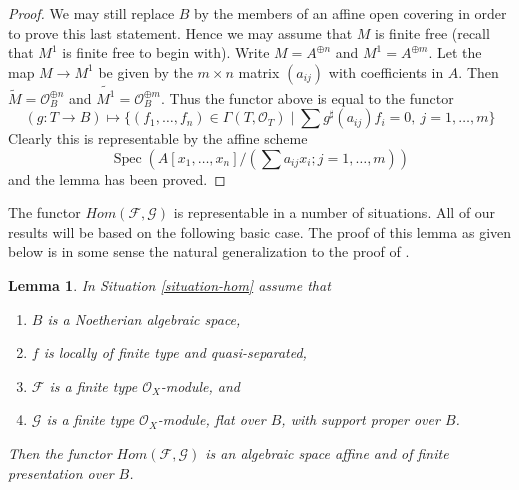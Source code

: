 \documentclass{stacks-project}
\theoremstyle{plain}
\newtheorem{lemma}[subsection]{Lemma}
\theoremstyle{definition}
\theoremstyle{remark}
\numberwithin{equation}{subsection}
\def\Spec{\mathop{\mathrm{Spec}}}
\begin{document}
\begin{proof}
\medskip\noindent
We may still replace $B$ by the members of an affine open covering
in order to prove this last statement. Hence we may assume that $M$
is finite free (recall that $M^1$ is finite free to begin with).
Write $M = A^{\oplus n}$ and $M^1 = A^{\oplus m}$. Let the map
$M \to M^1$ be given by the $m \times n$ matrix $(a_{ij})$ with
coefficients in $A$. Then $\widetilde{M} = \mathcal{O}_B^{\oplus n}$
and $\widetilde{M^1} = \mathcal{O}_B^{\oplus m}$. Thus the functor
above is equal to the functor
$$
(g : T \to B) \longmapsto
\{(f_1, \ldots, f_n) \in \Gamma(T, \mathcal{O}_T) \mid
\sum g^\sharp(a_{ij})f_i = 0,\ j = 1, \ldots, m\}
$$
Clearly this is representable by the affine scheme
$$
\Spec\left(A[x_1, \ldots, x_n]/(\sum a_{ij}x_i; j = 1, \ldots, m)\right)
$$
and the lemma has been proved.
\end{proof}

\noindent
The functor $\mathit{Hom}(\mathcal{F}, \mathcal{G})$ is representable in a
number of situations. All of our results will be based on the following
basic case. The proof of this lemma as given below is in some sense the
natural generalization to the proof of \cite[III, Cor 7.7.8]{EGA}.

\begin{lemma}
\label{lemma-noetherian-hom}
In Situation \ref{situation-hom} assume that
\begin{enumerate}
\item $B$ is a Noetherian algebraic space,
\item $f$ is locally of finite type and quasi-separated,
\item $\mathcal{F}$ is a finite type $\mathcal{O}_X$-module, and
\item $\mathcal{G}$ is a finite type $\mathcal{O}_X$-module, flat over $B$,
with support proper over $B$.
\end{enumerate}
Then the functor $\mathit{Hom}(\mathcal{F}, \mathcal{G})$ is
an algebraic space affine and of finite presentation over $B$.
\end{lemma}
\end{document}
